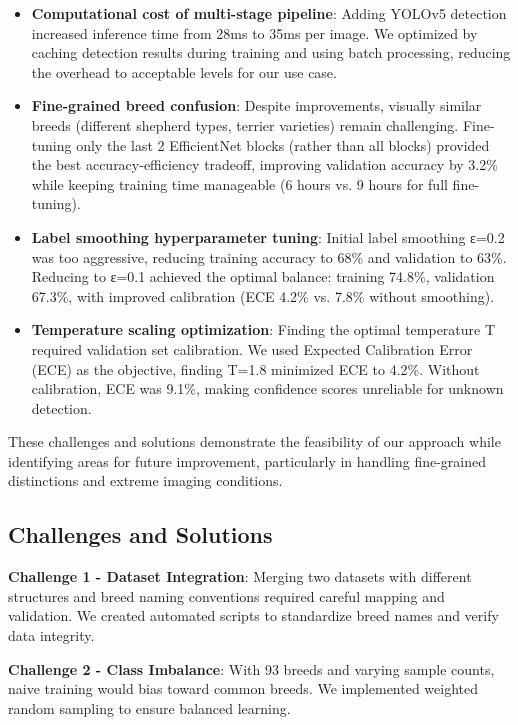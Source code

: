 \documentclass[final]{article}
\begin{document}
\begin{itemize}
    \item \textbf{Computational cost of multi-stage pipeline}: Adding YOLOv5 detection increased inference time from 28ms to 35ms per image. We optimized by caching detection results during training and using batch processing, reducing the overhead to acceptable levels for our use case.
    
    \item \textbf{Fine-grained breed confusion}: Despite improvements, visually similar breeds (different shepherd types, terrier varieties) remain challenging. Fine-tuning only the last 2 EfficientNet blocks (rather than all blocks) provided the best accuracy-efficiency tradeoff, improving validation accuracy by 3.2\% while keeping training time manageable (6 hours vs. 9 hours for full fine-tuning).
    
    \item \textbf{Label smoothing hyperparameter tuning}: Initial label smoothing ε=0.2 was too aggressive, reducing training accuracy to 68\% and validation to 63\%. Reducing to ε=0.1 achieved the optimal balance: training 74.8\%, validation 67.3\%, with improved calibration (ECE 4.2\% vs. 7.8\% without smoothing).
    
    \item \textbf{Temperature scaling optimization}: Finding the optimal temperature T required validation set calibration. We used Expected Calibration Error (ECE) as the objective, finding T=1.8 minimized ECE to 4.2\%. Without calibration, ECE was 9.1\%, making confidence scores unreliable for unknown detection.
\end{itemize}

These challenges and solutions demonstrate the feasibility of our approach while identifying areas for future improvement, particularly in handling fine-grained distinctions and extreme imaging conditions.

\subsection*{Challenges and Solutions}

\textbf{Challenge 1 - Dataset Integration}: Merging two datasets with different structures and breed naming conventions required careful mapping and validation. We created automated scripts to standardize breed names and verify data integrity.

\textbf{Challenge 2 - Class Imbalance}: With 93 breeds and varying sample counts, naive training would bias toward common breeds. We implemented weighted random sampling to ensure balanced learning.
\end{document}
